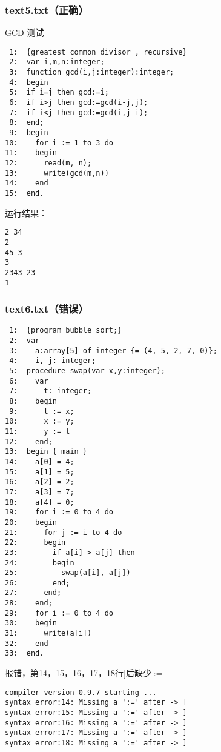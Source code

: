 \subsubsection{text5.txt（正确）}
GCD 测试
\begin{verbatim}
 1:  {greatest common divisor , recursive}
 2:  var i,m,n:integer;
 3:  function gcd(i,j:integer):integer;
 4:  begin
 5:  if i=j then gcd:=i;
 6:  if i>j then gcd:=gcd(i-j,j);
 7:  if i<j then gcd:=gcd(i,j-i);
 8:  end;
 9:  begin 
10:    for i := 1 to 3 do
11:    begin
12:      read(m, n);
13:      write(gcd(m,n))
14:    end
15:  end.
\end{verbatim}
运行结果：
\begin{verbatim}
2 34
2
45 3
3
2343 23
1
\end{verbatim}


\subsubsection{text6.txt（错误）}
\begin{verbatim}
 1:  {program bubble sort;}
 2:  var
 3:    a:array[5] of integer {= (4, 5, 2, 7, 0)};
 4:    i, j: integer;
 5:  procedure swap(var x,y:integer);
 6:    var
 7:      t: integer;
 8:    begin
 9:      t := x;
10:      x := y;
11:      y := t
12:    end;
13:  begin { main }
14:    a[0] = 4;
15:    a[1] = 5;
16:    a[2] = 2;
17:    a[3] = 7;
18:    a[4] = 0;
19:    for i := 0 to 4 do
20:    begin
21:      for j := i to 4 do
22:      begin
23:        if a[i] > a[j] then
24:        begin
25:          swap(a[i], a[j])
26:        end;
27:      end;
28:    end;
29:    for i := 0 to 4 do
30:    begin
31:      write(a[i])
32:    end
33:  end.
\end{verbatim}
报错，第14，15，16，17，18行$]$后缺少$:=$
\begin{verbatim}
compiler version 0.9.7 starting ...
syntax error:14: Missing a ':=' after -> ]
syntax error:15: Missing a ':=' after -> ]
syntax error:16: Missing a ':=' after -> ]
syntax error:17: Missing a ':=' after -> ]
syntax error:18: Missing a ':=' after -> ]
\end{verbatim}

